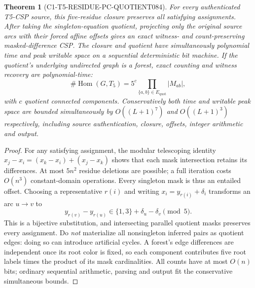 \documentclass[11pt]{article}
\newtheorem{theorem}{Theorem}
\begin{document}
\begin{theorem}[C1-T5-RESIDUE-PC-QUOTIENT084]
For every authenticated T5-CSP source, this five-residue closure preserves
\emph{all} satisfying assignments. After taking the singleton-equation
quotient, projecting only the \emph{original source arcs} with their
forced affine offsets gives an exact witness- and count-preserving
masked-difference CSP. The closure and quotient have simultaneously
polynomial time and peak writable space on a sequential deterministic
bit machine. If the quotient's underlying undirected graph is a forest,
exact counting and witness recovery are polynomial-time:
\[
  \#\operatorname{Hom}(G,T_5)=5^c
     \prod_{\{a,b\}\in E_{\mathrm{quot}}}|M_{ab}|,
\]
with $c$ quotient connected components. Conservatively both time
and writable peak space are bounded simultaneously by
$O((L+1)^7)$ and $O((L+1)^3)$ respectively, including source
authentication, closure, offsets, integer arithmetic and output.
\end{theorem}
\begin{proof}
For any satisfying assignment, the modular telescoping identity
$x_j-x_i=(x_k-x_i)+(x_j-x_k)$ shows that each mask intersection
retains its differences. At most $5n^2$ residue deletions are possible;
a full iteration costs $O(n^3)$ constant-domain operations.
Every singleton mask is thus an entailed offset. Choosing a
representative $r(i)$ and writing
$x_i=y_{r(i)}+\delta_i$ transforms an arc $u\to v$ to
\[
 y_{r(v)}-y_{r(u)}
 \in\{1,3\}+\delta_u-\delta_v\pmod5.
\]
This is a bijective substitution, and intersecting parallel quotient
masks preserves every assignment. Do \emph{not} materialize all
nonsingleton inferred pairs as quotient edges: doing so can introduce
artificial cycles. A forest's edge differences are independent
once its root color is fixed, so each component contributes five
root labels times the product of its mask cardinalities.
All counts have at most $O(n)$ bits; ordinary sequential arithmetic,
parsing and output fit the conservative simultaneous bounds.
\end{proof}
\end{document}

